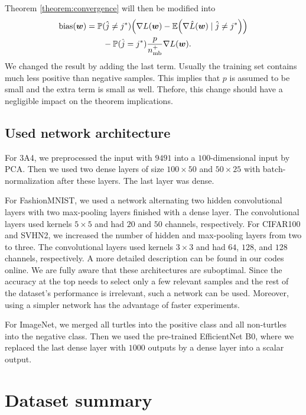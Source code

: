 Theorem \ref{theorem:convergence} will then be modified into
\begin{equation*}
  \begin{aligned}
    \bias(\bm w)
    & = \PP(\hat j\neq j^*) \Brac{\nabla L(\bm w) - \EE\Brac{\nabla \hat L(\bm w) \mid \hat j\neq j^*}} \\
    & \qquad - \PP(\hat j= j^*)\frac{p}{\nmin^+}\nabla L(\bm w).
  \end{aligned}
\end{equation*}
We changed the result by adding the last term. Usually the training set contains much less positive than negative samples. This implies that $p$ is assumed to be small and the extra term is small as well. Thefore, this change should have a negligible impact on the theorem implications.

\subsection{Used network architecture}\label{app:network}

For 3A4, we preprocessed the input with $9491$ into a $100$-dimensional input by PCA. Then we used two dense layers of size $100\times 50$ and $50\times 25$ with batch-normalization after these layers. The last layer was dense.

For FashionMNIST, we used a network alternating two hidden convolutional layers with two max-pooling layers finished with a dense layer. The convolutional layers used kernels $5\times 5$ and had $20$ and $50$ channels, respectively. For CIFAR100 and SVHN2, we increased the number of hidden and max-pooling layers from two to three. The convolutional layers used kernels $3\times 3$ and had $64$, $128$, and $128$ channels, respectively. A more detailed description can be found in our codes online. We are fully aware that these architectures are suboptimal. Since the accuracy at the top needs to select only a few relevant samples and the rest of the dataset's performance is irrelevant, such a network can be used. Moreover, using a simpler network has the advantage of faster experiments.

For ImageNet, we merged all turtles into the positive class and all non-turtles into the negative class. Then we used the pre-trained EfficientNet B0, where we replaced the last dense layer with $1000$ outputs by a dense layer into a scalar output.

\section{Dataset summary}

